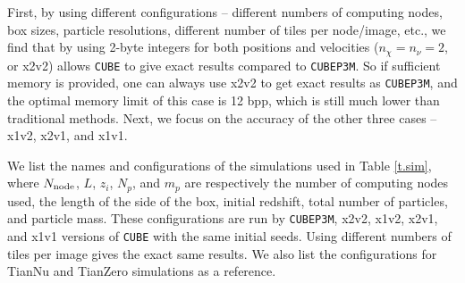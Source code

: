 \documentclass[10pt,twocolumn,preprint]{emulateapj}
\begin{document}
First, by using different configurations -- different numbers of computing nodes, box sizes, particle resolutions, different number of tiles per node/image, etc., we find that by using 2-byte integers for both positions and velocities ($n_\chi=n_\nu=2$, or x2v2) allows {\tt CUBE} to give exact results compared to {\tt CUBEP3M}. So if sufficient memory is provided, one can always use x2v2 to get exact results as {\tt CUBEP3M}, and the optimal memory limit of this case is 12 bpp, which is still much lower than traditional methods. Next, we focus on the accuracy of the other three cases -- x1v2, x2v1, and x1v1.

We list the names and configurations of the simulations used in Table \ref{t.sim}, where $N_{\rm node}$, $L$, $z_i$, $N_p$, and $m_p$ are respectively the number of computing nodes used, the length of the side of the box, initial redshift, total number of particles, and particle mass. These configurations are run by {\tt CUBEP3M}, x2v2, x1v2, x2v1, and x1v1 versions of {\tt CUBE} with the same initial seeds. Using different numbers of tiles per image gives the exact same results. We also list the configurations for TianNu and TianZero \citep{2017NatAs...1E.143Y,2017RAA....17...85E} simulations as a reference.
\end{document}
